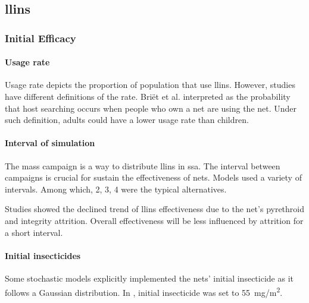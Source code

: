 \documentclass[a4paper, 12pt, twoside]{report}
\begin{document}
\subsection{\texorpdfstring{\gls{llins}}{LLINs}}%
\label{sub:llins}

\subsubsection{Initial Efficacy}%
\label{subsub:initial_efficacy}

\paragraph{Usage rate}%
\label{par:usage_rate}

Usage rate depicts the proportion of population that use \gls{llins}.
However, studies have different definitions of the rate.
Briët et al.\cite{Briet2013} interpreted as the probability that host searching occurs when people who own a net are using the net.
Under such definition, adults could have a lower usage rate than children.

\paragraph{Interval of simulation}%
\label{par:interval_of_simulation}
The mass campaign is a way to distribute \gls{llins} in \gls{ssa}.
The interval between campaigns is crucial for sustain the effectiveness of nets.
Models used a variety of intervals.
Among which, 2, 3, 4\cite{Walker2016} were the typical alternatives.

Studies showed the declined trend of \gls{llins} effectiveness due to the net's pyrethroid and integrity attrition.
Overall effectiveness will be less influenced by attrition for a short interval.

\paragraph{Initial insecticides}%
\label{par:initial_insecticides}
Some stochastic models explicitly implemented the nets' initial insecticide as it follows a Gaussian distribution.
In \cite{Briet2013}, initial insecticide was set to \SI{55}{mg/m^2}.
\end{document}
